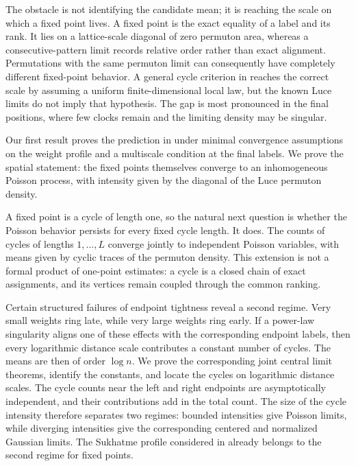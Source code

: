 \documentclass[11pt]{article}
\theoremstyle{remark}
\theoremstyle{plain}
\begin{document}
The obstacle is not identifying the candidate mean; it is reaching the scale
on which a fixed point lives.  A fixed point is the exact equality of a label
and its rank.  It lies on a lattice-scale diagonal of zero permuton area,
whereas a consecutive-pattern limit records relative order rather than exact
alignment.  Permutations with the same permuton limit can consequently have
completely different fixed-point behavior.  A general cycle criterion in
\cite{mukherjee2016fixed} reaches the correct scale by assuming a uniform
finite-dimensional local law, but the known Luce limits do not imply that
hypothesis.  The gap is most pronounced in the final positions, where few
clocks remain and the limiting density may be singular.

Our first result proves the prediction in
\cite{borga2025permutonlocallimitsluce} under minimal convergence assumptions
on the weight profile and a multiscale condition at the final labels.  We prove
the spatial statement: the fixed points themselves converge to an
inhomogeneous Poisson process, with intensity given by the diagonal of the
Luce permuton density.

A fixed point is a cycle of length one, so the natural next question is
whether the Poisson behavior persists for every fixed cycle length.  It does.
The counts of cycles of lengths $1,\ldots,L$ converge jointly to independent
Poisson variables, with means given by cyclic traces of the permuton density.
This extension is not a formal product of one-point estimates: a cycle is a
closed chain of exact assignments, and its vertices remain coupled through
the common ranking.

Certain structured failures of endpoint tightness reveal a second regime.
Very small weights ring late, while very large weights ring early.  If a
power-law singularity aligns one of these effects with the corresponding
endpoint labels, then every logarithmic distance scale contributes a constant
number of cycles.  The means are then of order
$\log n$.  We prove the corresponding joint central limit theorems, identify
the constants, and locate the cycles on logarithmic distance scales.  The
cycle counts near the left and right endpoints are asymptotically independent,
and their contributions add in the total count.  The size of the cycle
intensity therefore separates two regimes: bounded intensities give Poisson
limits, while diverging intensities give the corresponding centered and
normalized Gaussian limits.  The Sukhatme profile considered in
\cite{borga2025permutonlocallimitsluce} already belongs to the second regime
for fixed points.
\end{document}
